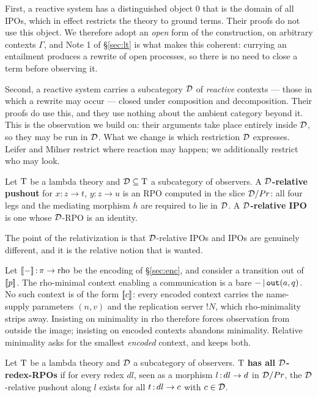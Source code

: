 \documentclass{article}
\begin{document}
First, a reactive system has a distinguished object $0$ that is the domain of all IPOs, which in effect restricts the theory to ground terms. Their proofs do not use this object. We therefore adopt an \emph{open} form of the construction, on arbitrary contexts $\Gamma$, and Note 1 of \S\ref{sec:lt} is what makes this coherent: currying an entailment produces a rewrite of open processes, so there is no need to close a term before observing it.

Second, a reactive system carries a subcategory $\mathcal{D}$ of \emph{reactive} contexts --- those in which a rewrite may occur --- closed under composition and decomposition. Their proofs do use this, and they use nothing about the ambient category beyond it. This is the observation we build on: their arguments take place entirely inside $\mathcal{D}$, so they may be run in $\mathcal{D}$. What we change is which restriction $\mathcal{D}$ expresses. Leifer and Milner restrict where reaction may happen; we additionally restrict who may look.

\begin{definition}
\label{def:drpo}
    Let $\mathrm{T}$ be a lambda theory and $\mathcal{D}\subseteq \mathrm{T}$ a subcategory of observers. A \textbf{$\mathcal{D}$-relative pushout} for $x:z\to t$, $y:z\to u$ is an RPO computed in the slice $\mathcal{D}/Pr$: all four legs and the mediating morphism $h$ are required to lie in $\mathcal{D}$. A \textbf{$\mathcal{D}$-relative IPO} is one whose $\mathcal{D}$-RPO is an identity.
\end{definition}

The point of the relativization is that $\mathcal{D}$-relative IPOs and IPOs are genuinely different, and it is the relative notion that is wanted.

\begin{example}
\label{ex:minimality}
    Let $[\![-]\!]\,{:}\, \pi\to\mathrm{rho}$ be the encoding of \S\ref{sec:enc}, and consider a transition out of $[\![p]\!]$. The rho-minimal context enabling a communication is a bare $-\,|\,\mathtt{out}(a,q)$. No such context is of the form $[\![c]\!]$: every encoded context carries the name-supply parameters $(n,v)$ and the replication server $!N$, which rho-minimality strips away. Insisting on minimality in rho therefore forces observation from outside the image; insisting on encoded contexts abandons minimality. Relative minimality asks for the smallest \emph{encoded} context, and keeps both.
\end{example}

\begin{definition}
    Let $\mathrm{T}$ be a lambda theory and $\mathcal{D}$ a subcategory of observers. $\mathrm{T}$ \textbf{has all $\mathcal{D}$-redex-RPOs} if for every redex $dl$, seen as a morphism $l\,{:}\, dl\to d$ in $\mathcal{D}/Pr$, the $\mathcal{D}$-relative pushout along $l$ exists for all $t\,{:}\, dl\to c$ with $c\in\mathcal{D}$.
\end{definition}
\end{document}
